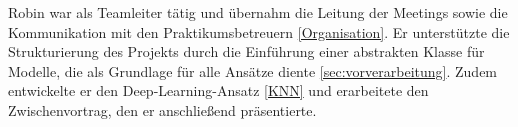 Robin war als Teamleiter tätig und übernahm die Leitung der Meetings sowie die Kommunikation mit den Praktikumsbetreuern {\ref{Organisation}}. Er unterstützte die Strukturierung des Projekts durch die Einführung einer abstrakten Klasse für Modelle, die als Grundlage für alle Ansätze diente {\ref{sec:vorverarbeitung}}. Zudem entwickelte er den Deep-Learning-Ansatz {\ref{KNN}} und erarbeitete den Zwischenvortrag, den er anschließend präsentierte.
